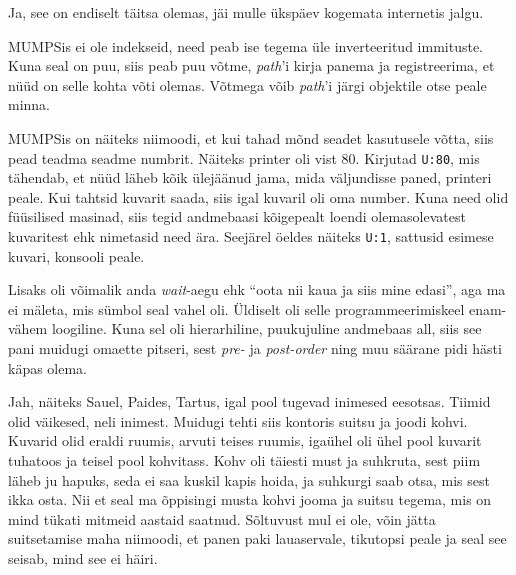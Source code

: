 
Ja, see on endiselt täitsa olemas, jäi mulle ükspäev kogemata 
internetis jalgu. 

MUMPSis ei ole indekseid, need peab ise tegema üle inverteeritud 
immituste. Kuna seal on puu, siis peab puu võtme, \emph{path}'i kirja 
panema ja registreerima, et nüüd on selle kohta võti olemas. Võtmega
võib \emph{path}'i järgi objektile otse peale minna. 

MUMPSis on näiteks niimoodi, et kui tahad mõnd seadet kasutusele võtta, 
siis pead teadma seadme numbrit. Näiteks printer oli 
vist 80. Kirjutad \verb|U:80|, mis tähendab, et nüüd läheb kõik ülejäänud jama, mida 
väljundisse paned, printeri peale. Kui tahtsid kuvarit saada, siis 
igal kuvaril oli oma number. Kuna need olid füüsilised masinad, siis tegid 
andmebaasi kõigepealt loendi olemasolevatest kuvaritest ehk nimetasid need
ära. Seejärel öeldes näiteks \verb|U:1|, sattusid 
esimese kuvari, konsooli peale. 

Lisaks oli võimalik anda \emph{wait}-aegu ehk \enquote{oota nii kaua ja siis mine edasi}, aga ma ei mäleta, mis sümbol 
seal vahel oli. Üldiselt oli selle programmeerimiskeel enam-vähem loogiline. Kuna sel oli 
hierarhiline, puukujuline andmebaas all, siis see pani muidugi omaette 
pitseri, sest \emph{pre-} ja \emph{post-order} ning muu säärane 
pidi hästi käpas olema. 


Jah, näiteks Sauel, Paides, Tartus, igal pool 
tugevad inimesed eesotsas. Tiimid olid väikesed, neli inimest. Muidugi tehti siis kontoris suitsu 
ja joodi kohvi. Kuvarid olid eraldi ruumis, arvuti teises ruumis, 
igaühel oli ühel pool kuvarit tuhatoos ja teisel pool kohvitass. Kohv oli täiesti 
must ja suhkruta, sest piim läheb ju hapuks, seda ei saa kuskil 
kapis hoida, ja suhkurgi saab otsa, mis sest ikka osta. Nii et seal ma õppisingi musta 
kohvi jooma ja suitsu tegema, mis on mind tükati mitmeid aastaid 
saatnud. Sõltuvust mul ei ole, võin jätta suitsetamise 
maha niimoodi, et panen paki lauaservale, tikutopsi peale ja seal see 
seisab, mind see ei häiri. 


